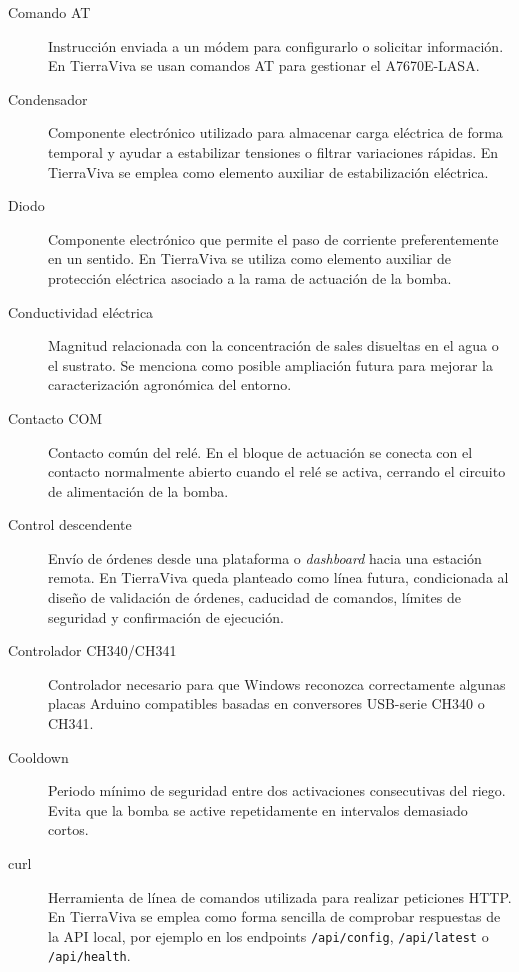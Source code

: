 \begin{description}
    \item[Comando AT]
    Instrucción enviada a un módem para configurarlo o solicitar información. En TierraViva se usan comandos AT para gestionar el A7670E-LASA.

    \item[Condensador]
    Componente electrónico utilizado para almacenar carga eléctrica de forma temporal y ayudar a estabilizar tensiones o filtrar variaciones rápidas. En TierraViva se emplea como elemento auxiliar de estabilización eléctrica.

    \item[Diodo]
    Componente electrónico que permite el paso de corriente preferentemente en un sentido. En TierraViva se utiliza como elemento auxiliar de protección eléctrica asociado a la rama de actuación de la bomba.

    \item[Conductividad eléctrica]
    Magnitud relacionada con la concentración de sales disueltas en el agua o el sustrato. Se menciona como posible ampliación futura para mejorar la caracterización agronómica del entorno.

    \item[Contacto COM]
    Contacto común del relé. En el bloque de actuación se conecta con el contacto normalmente abierto cuando el relé se activa, cerrando el circuito de alimentación de la bomba.

    \item[Control descendente]
    Envío de órdenes desde una plataforma o \textit{dashboard} hacia una estación remota. En TierraViva queda planteado como línea futura, condicionada al diseño de validación de órdenes, caducidad de comandos, límites de seguridad y confirmación de ejecución.

    \item[Controlador CH340/CH341]
    Controlador necesario para que Windows reconozca correctamente algunas placas Arduino compatibles basadas en conversores USB-serie CH340 o CH341.

    \item[Cooldown]
    Periodo mínimo de seguridad entre dos activaciones consecutivas del riego. Evita que la bomba se active repetidamente en intervalos demasiado cortos.

    \item[curl]
    Herramienta de línea de comandos utilizada para realizar peticiones HTTP. En TierraViva se emplea como forma sencilla de comprobar respuestas de la API local, por ejemplo en los endpoints \texttt{/api/config}, \texttt{/api/latest} o \texttt{/api/health}.


\end{description}
